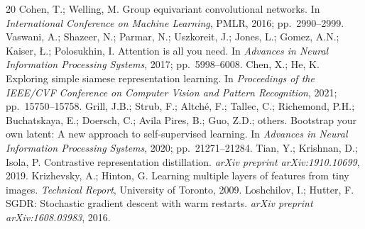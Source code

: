\documentclass[symmetry,article,submit,pdftex,moreauthors]{Definitions/mdpi}
\begin{document}
\begin{thebibliography}{20}
 Cohen, T.; Welling, M. Group equivariant convolutional networks. In \textit{International Conference on Machine Learning}, PMLR, 2016; pp.~2990--2999.
 Vaswani, A.; Shazeer, N.; Parmar, N.; Uszkoreit, J.; Jones, L.; Gomez, A.N.; Kaiser, \L.; Polosukhin, I. Attention is all you need. In \textit{Advances in Neural Information Processing Systems}, 2017; pp.~5998--6008.
 Chen, X.; He, K. Exploring simple siamese representation learning. In \textit{Proceedings of the IEEE/CVF Conference on Computer Vision and Pattern Recognition}, 2021; pp.~15750--15758.
 Grill, J.B.; Strub, F.; Altch\'{e}, F.; Tallec, C.; Richemond, P.H.; Buchatskaya, E.; Doersch, C.; Avila Pires, B.; Guo, Z.D.; others. Bootstrap your own latent: A new approach to self-supervised learning. In \textit{Advances in Neural Information Processing Systems}, 2020; pp.~21271--21284.
 Tian, Y.; Krishnan, D.; Isola, P. Contrastive representation distillation. \textit{arXiv preprint arXiv:1910.10699}, 2019.
 Krizhevsky, A.; Hinton, G. Learning multiple layers of features from tiny images. \textit{Technical Report}, University of Toronto, 2009.
 Loshchilov, I.; Hutter, F. SGDR: Stochastic gradient descent with warm restarts. \textit{arXiv preprint arXiv:1608.03983}, 2016.
\end{thebibliography}

\PublishersNote{}
\end{document}
